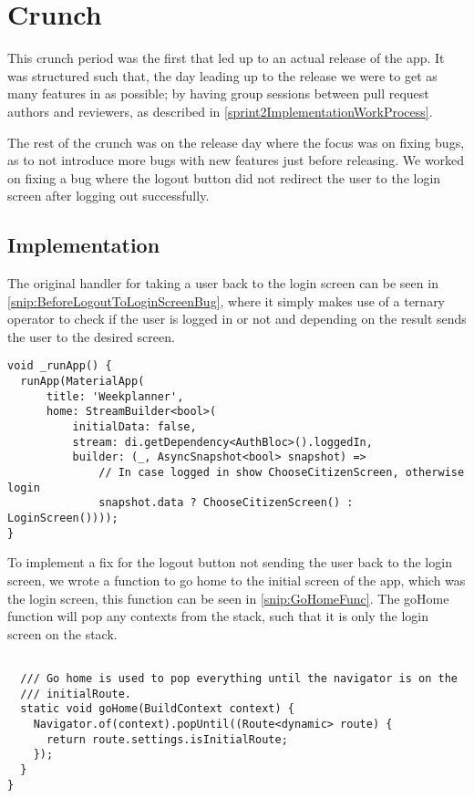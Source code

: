 \section{Crunch}
This crunch period was the first that led up to an actual release of the app.
It was structured such that, the day leading up to the release we were to get as many features in as possible; by having group sessions between pull request authors and reviewers, as described in \autoref{sprint2ImplementationWorkProcess}.

The rest of the crunch was on the release day where the focus was on fixing bugs, as to not introduce more bugs with new features just before releasing. 
We worked on fixing a bug where the logout button did not redirect the user to the login screen after logging out successfully.

\subsection{Implementation}
The original handler for taking a user back to the login screen can be seen in \autoref{snip:BeforeLogoutToLoginScreenBug}, where it simply makes use of a ternary operator to check if the user is logged in or not and depending on the result sends the user to the desired screen.

\begin{lstlisting}[label={snip:BeforeLogoutToLoginScreenBug}, caption={The \_runApp function before the bug fix}, captionpos=b, language=CSharp]
void _runApp() {
  runApp(MaterialApp(
      title: 'Weekplanner',
      home: StreamBuilder<bool>(
          initialData: false,
          stream: di.getDependency<AuthBloc>().loggedIn,
          builder: (_, AsyncSnapshot<bool> snapshot) =>
              // In case logged in show ChooseCitizenScreen, otherwise login
              snapshot.data ? ChooseCitizenScreen() : LoginScreen())));
}
\end{lstlisting}

To implement a fix for the logout button not sending the user back to the login screen, we wrote a function to go home to the initial screen of the app, which was the login screen, this function can be seen in \autoref{snip:GoHomeFunc}.
The goHome function will pop any contexts from the stack, such that it is only the login screen on the stack.

\begin{lstlisting}[label={snip:GoHomeFunc}, caption={The goHome function, which returns to the login screen from anywhere}, captionpos=b, language=CSharp]

  /// Go home is used to pop everything until the navigator is on the
  /// initialRoute.
  static void goHome(BuildContext context) {
    Navigator.of(context).popUntil((Route<dynamic> route) {
      return route.settings.isInitialRoute;
    });
  }
}
\end{lstlisting}

